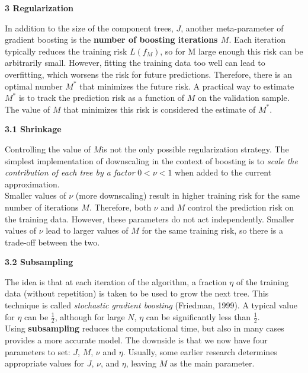 \documentclass[12pt, letterpaper, twoside]{article}
\begin{document}
\begin{center}
\textbf{\large{3 Regularization}\\}
\end{center}
\hspace*{4ex} In addition to the size of the component trees, $J$, another meta-parameter of gradient boosting is the \textbf{number of boosting iterations $M$}. Each iteration typically reduces the training risk $L(f_M)$, so for M large enough this risk can be arbitrarily small. However, fitting the training data too well can lead to overfitting, which worsens the risk for future predictions. Therefore, there is an optimal number $M^*$ that minimizes the future risk. A practical way to estimate $M^*$ is to track the prediction risk as a function of $M$ on the validation sample. The value of $M$ that minimizes this risk is considered the estimate of $M^*$.\\
\begin{center}
\textbf{\large{3.1 Shrinkage}\\}
\end{center}
\hspace*{4ex} Controlling the value of $M $is not the only possible regularization strategy. The simplest implementation of downscaling in the context of boosting is to \emph{scale the contribution of each tree by a factor} $0 < \nu < 1$ when added to the current approximation.\\
\hspace*{4ex}Smaller values of $\nu$ (more downscaling) result in higher training risk for the same number of iterations $M$. Therefore, both $\nu$ and $M$ control the prediction risk on the training data. However, these parameters do not act independently. Smaller values of $\nu$ lead to larger values of $M$ for the same training risk, so there is a trade-off between the two.
\begin{center}
\textbf{\large{3.2 Subsampling}}
\end{center}
\hspace*{4ex}The idea is that at each iteration of the algorithm, a fraction $\eta$ of the training data (without repetition) is taken to be used to grow the next tree. This technique is called \emph{stochastic gradient boosting} (Friedman, 1999). A typical value for $\eta$ can be $\frac{1}{2}$, although for large $N$, $\eta$ can be significantly less than $\frac{1}{2}$.\\
\hspace*{4ex}Using \textbf{subsampling} reduces the computational time, but also in many cases provides a more accurate model. The downside is that we now have four parameters to set: $J$, $M$, $\nu$ and $\eta$. Usually, some earlier research determines appropriate values for $J$, $\nu$, and $\eta$, leaving $M$ as the main parameter.
\end{document}
